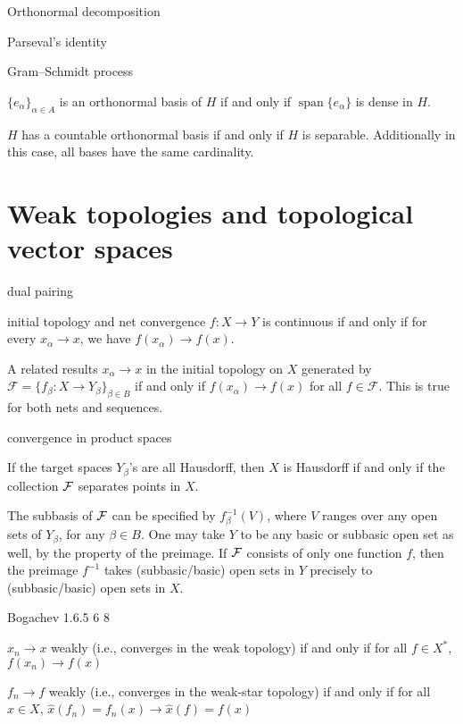 Orthonormal decomposition

Parseval's identity

Gram--Schmidt process

\begin{thm}
    $\{e_\alpha\}_{\alpha \in A}$ is an orthonormal basis of $H$ if and only if $\operatorname{span}\{e_\alpha\}$ is dense in $H$.
\end{thm}

\begin{thm}
    $H$ has a countable orthonormal basis if and only if $H$ is separable. Additionally in this case, all bases have the same cardinality.
\end{thm}



\section{Weak topologies and topological vector spaces}

dual pairing

initial topology and net convergence
$f\colon X \to Y$ is continuous if and only if for every $x_\alpha \to x$, we have $f(x_\alpha) \to f(x)$.

A related results $x_\alpha \to x$ in the initial topology on $X$ generated by $\mathcal{F} = \{f_\beta \colon X \to Y_\beta\}_{\beta \in B}$ if and only if $f(x_\alpha) \to f(x)$ for all $f \in \mathcal{F}$. This is true for both nets and sequences.

convergence in product spaces

If the target spaces $Y_\beta$'s are all Hausdorff, then $X$ is Hausdorff if and only if the collection $\mathcal{F}$ separates points in $X$.

The subbasis of $\mathcal{F}$ can be specified by $f_\beta^{-1}(V)$, where $V$ ranges over any open sets of $Y_\beta$, for any $\beta \in B$. One may take $Y$ to be any basic or subbasic open set as well, by the property of the preimage. If $\mathcal{F}$ consists of only one function $f$, then the preimage $f^{-1}$ takes (subbasic/basic) open sets in $Y$ precisely to (subbasic/basic) open sets in $X$.

Bogachev 1.6.5 6 8

$x_n \to x$ weakly (i.e., converges in the weak topology) if and only if for all $f \in X^*$, $f(x_n) \to f(x)$



$f_n \to f$ weakly (i.e., converges in the weak-star topology) if and only if for all $x \in X$, $\hat{x}(f_n) = f_n(x) \to \hat{x}(f) = f(x)$

